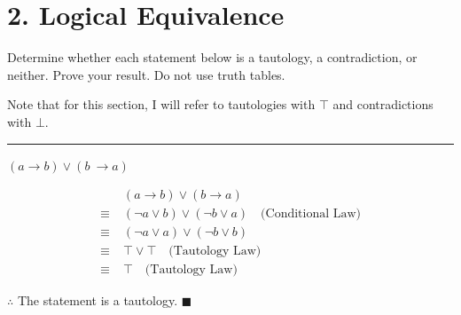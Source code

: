 \documentclass[]{article}
\begin{document}
\section*{2. Logical Equivalence}
Determine whether each statement below is a tautology, a contradiction, or neither. Prove your result. Do not
use truth tables.

\begin{center}
    Note that for this section, I will refer to tautologies with $\top$ and contradictions with $\bot$.
\end{center}
\vspace{0.1in}
\hrule
\vspace{0.1in}
\begin{question}
    $(a \rightarrow b) \lor (b\ \rightarrow a)$
\end{question}
\begin{align*}
    & (a \rightarrow b) \lor (b \rightarrow a) \\
    \equiv\; & (\neg a \lor b) \lor (\neg b \lor a) \quad \text{(Conditional Law)} \\
    \equiv\; & (\neg a \lor a) \lor (\neg b \lor b) \quad \\
    \equiv\;&  \top \lor \top \quad \text{(Tautology Law)} \\
    \equiv\; & \top \quad \text{(Tautology Law)}
\end{align*}
\begin{center}
    $\therefore$ The statement is a tautology. $\blacksquare$
\end{center}
\end{document}
